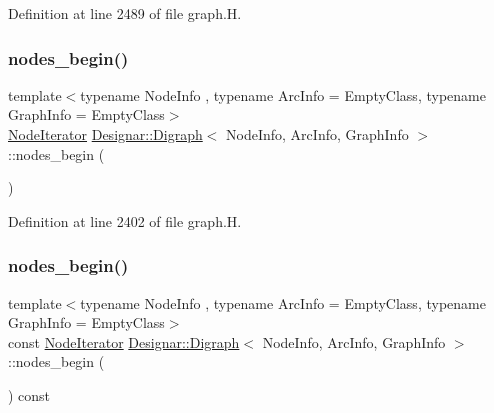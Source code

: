 Definition at line 2489 of file graph.\+H.

\mbox{\label{class_designar_1_1_digraph_af2a2ede7d4af852e67705f2c2bf394d2}} 
\subsubsection{\texorpdfstring{nodes\+\_\+begin()}{nodes\_begin()}\hspace{0.1cm}{\footnotesize\ttfamily [1/2]}}
{\footnotesize\ttfamily template$<$typename Node\+Info , typename Arc\+Info  = Empty\+Class, typename Graph\+Info  = Empty\+Class$>$ \\
\hyperlink{class_designar_1_1_digraph_1_1_node_iterator}{Node\+Iterator} \hyperlink{class_designar_1_1_digraph}{Designar\+::\+Digraph}$<$ Node\+Info, Arc\+Info, Graph\+Info $>$\+::nodes\+\_\+begin (\begin{DoxyParamCaption}{ }\end{DoxyParamCaption})\hspace{0.3cm}{\ttfamily [inline]}}



Definition at line 2402 of file graph.\+H.

\mbox{\label{class_designar_1_1_digraph_a6fcecdd41bdd4af1a0e1a7a5a3e8a3eb}} 
\subsubsection{\texorpdfstring{nodes\+\_\+begin()}{nodes\_begin()}\hspace{0.1cm}{\footnotesize\ttfamily [2/2]}}
{\footnotesize\ttfamily template$<$typename Node\+Info , typename Arc\+Info  = Empty\+Class, typename Graph\+Info  = Empty\+Class$>$ \\
const \hyperlink{class_designar_1_1_digraph_1_1_node_iterator}{Node\+Iterator} \hyperlink{class_designar_1_1_digraph}{Designar\+::\+Digraph}$<$ Node\+Info, Arc\+Info, Graph\+Info $>$\+::nodes\+\_\+begin (\begin{DoxyParamCaption}{ }\end{DoxyParamCaption}) const\hspace{0.3cm}{\ttfamily [inline]}}



